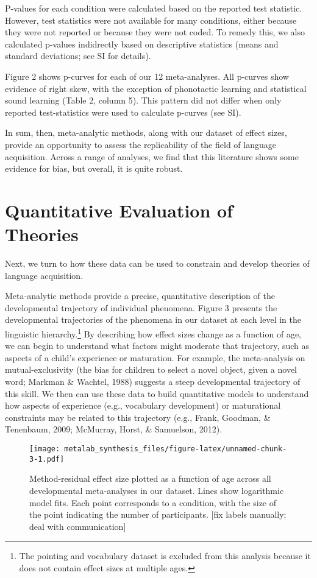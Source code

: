 \documentclass[english,floatsintext,man]{apa6}
\begin{document}
P-values for each condition were calculated based on the reported test
statistic. However, test statistics were not available for many
conditions, either because they were not reported or because they were
not coded. To remedy this, we also calculated p-values indidrectly based
on descriptive statistics (means and standard deviations; see SI for
details).

Figure 2 shows p-curves for each of our 12 meta-analyses. All p-curves
show evidence of right skew, with the exception of phonotactic learning
and statistical sound learning (Table 2, column 5). This pattern did not
differ when only reported test-statistics were used to calculate
p-curves (see SI).

In sum, then, meta-analytic methods, along with our dataset of effect
sizes, provide an opportunity to assess the replicability of the field
of language acquisition. Across a range of analyses, we find that this
literature shows some evidence for bias, but overall, it is quite
robust.

\section{Quantitative Evaluation of
Theories}\label{quantitative-evaluation-of-theories}

Next, we turn to how these data can be used to constrain and develop
theories of language acquisition.

Meta-analytic methods provide a precise, quantitative description of the
developmental trajectory of individual phenomena. Figure 3 presents the
developmental trajectories of the phenomena in our dataset at each level
in the linguistic
hierarchy.\footnote{The pointing and vocabulary dataset is excluded from this analysis because it does not contain effect sizes at multiple ages.}
By describing how effect sizes change as a function of age, we can begin
to understand what factors might moderate that trajectory, such as
aspects of a child's experience or maturation. For example, the
meta-analysis on mutual-exclusivity (the bias for children to select a
novel object, given a novel word; Markman \& Wachtel, 1988) suggests a
steep developmental trajectory of this skill. We then can use these data
to build quantitative models to understand how aspects of experience
(e.g., vocabulary development) or maturational constraints may be
related to this trajectory (e.g., Frank, Goodman, \& Tenenbaum, 2009;
McMurray, Horst, \& Samuelson, 2012).

\begin{figure}[htbp]
\centering
\texttt{[image: metalab\_synthesis\_files/figure-latex/unnamed-chunk-3-1.pdf]}
\caption{Method-residual effect size plotted as a function of age across
all developmental meta-analyses in our dataset. Lines show logarithmic
model fits. Each point corresponds to a condition, with the size of the
point indicating the number of participants. {[}fix labels manually;
deal with communication{]}}
\end{figure}
\end{document}
